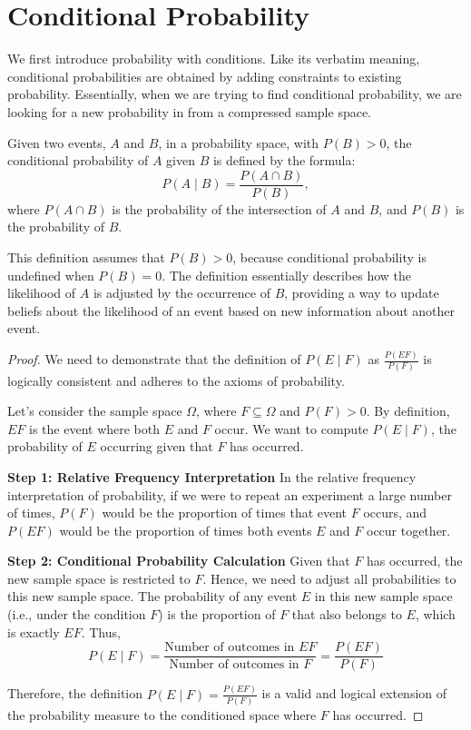 \section{Conditional Probability}
We first introduce probability with conditions. Like its verbatim meaning, conditional probabilities are obtained by adding constraints to existing probability. Essentially, when we 
are trying to find conditional probability, we are looking for a new probability in from a compressed sample space.
\begin{definition}
    Given two events, \(A\) and \(B\), in a probability space, with \(P(B) > 0\), the conditional probability of \(A\) given \(B\) is defined by the formula:
    \[
    P(A \mid B) = \frac{P(A \cap B)}{P(B)},
    \]
    where \(P(A \cap B)\) is the probability of the intersection of \(A\) and \(B\), and \(P(B)\) is the probability of \(B\).
    \end{definition}
\begin{remark}
    This definition assumes that \(P(B) > 0\), because conditional probability is undefined when \(P(B) = 0\). The definition essentially describes how the likelihood of \(A\) is adjusted by the occurrence of \(B\), providing a way to update beliefs about the likelihood of an event based on new information about another event.
\end{remark}
\begin{proof}
    We need to demonstrate that the definition of \( P(E \mid F) \) as \( \frac{P(EF)}{P(F)} \) is logically consistent and adheres to the axioms of probability.
    
    Let's consider the sample space \(\Omega\), where \( F \subseteq \Omega \) and \( P(F) > 0 \). By definition, \( EF \) is the event where both \( E \) and \( F \) occur. We want to compute \( P(E \mid F) \), the probability of \( E \) occurring given that \( F \) has occurred.
    
    \textbf{Step 1: Relative Frequency Interpretation}
    In the relative frequency interpretation of probability, if we were to repeat an experiment a large number of times, \( P(F) \) would be the proportion of times that event \( F \) occurs, and \( P(EF) \) would be the proportion of times both events \( E \) and \( F \) occur together.
    
    \textbf{Step 2: Conditional Probability Calculation}
    Given that \( F \) has occurred, the new sample space is restricted to \( F \). Hence, we need to adjust all probabilities to this new sample space. The probability of any event \( E \) in this new sample space (i.e., under the condition \( F \)) is the proportion of \( F \) that also belongs to \( E \), which is exactly \( EF \). Thus,
    \[
    P(E \mid F) = \frac{\text{Number of outcomes in } EF}{\text{Number of outcomes in } F} = \frac{P(EF)}{P(F)}
    \]
    
    Therefore, the definition \( P(E \mid F) = \frac{P(EF)}{P(F)} \) is a valid and logical extension of the probability measure to the conditioned space where \( F \) has occurred.
    \end{proof}
    
